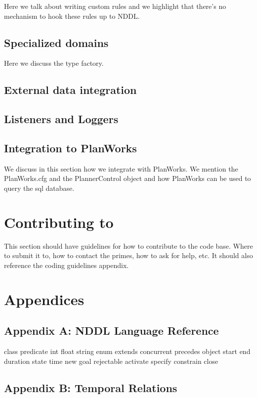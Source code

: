 \documentclass[10pt, letterpaper, twoside]{article}
\begin{document}
Here we talk about writing custom rules and we highlight that there's no
mechanism to hook these rules up to NDDL.

\subsection{Specialized domains}

Here we discuss the type factory.

\subsection{External data integration}


\subsection{Listeners and Loggers}
\subsection{Integration to PlanWorks}

We discuss in this section how we integrate with PlanWorks.  We mention the
PlanWorks.cfg and the PlannerControl object and how PlanWorks can be used
to query the sql database.

\section{Contributing to \ET}

This section should have guidelines for how to contribute to the code
base.  Where to submit it to, how to contact the primes, how to ask for
help, etc.  It should also reference the coding guidelines appendix.




\section{Appendices}
\subsection{Appendix A: NDDL Language Reference}
\label{nddl}

class
predicate
int
float
string
enum
extends
concurrent
precedes
object
start
end
duration
state
time
new
goal
rejectable
activate
specify
constrain
close

\subsection{Appendix B: Temporal Relations}
\label{allen}
\end{document}

